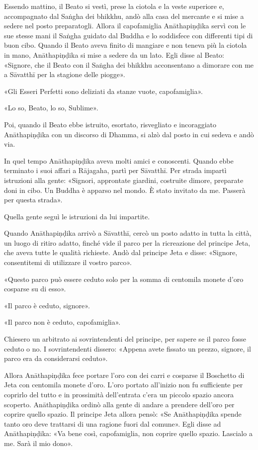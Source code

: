 Essendo mattino, il Beato si vestì, prese la ciotola e la veste superiore e,
accompagnato dal Saṅgha dei bhikkhu, andò alla casa del mercante e si mise a
sedere nel posto preparatogli. Allora il capofamiglia Anāthapiṇḍika servì con le
sue stesse mani il Saṅgha guidato dal Buddha e lo soddisfece con differenti tipi
di buon cibo. Quando il Beato aveva finito di mangiare e non teneva più la
ciotola in mano, Anāthapiṇḍika si mise a sedere da un lato. Egli disse al Beato:
«Signore, che il Beato con il Saṅgha dei bhikkhu acconsentano a dimorare con me
a Sāvatthī per la stagione delle piogge».

«Gli Esseri Perfetti sono deliziati da stanze vuote, capofamiglia».

«Lo so, Beato, lo so, Sublime».

Poi, quando il Beato ebbe istruito, esortato, risvegliato e incoraggiato
Anāthapiṇḍika con un discorso di Dhamma, si alzò dal posto in cui sedeva e andò
via.

In quel tempo Anāthapiṇḍika aveva molti amici e conoscenti. Quando ebbe
terminato i suoi affari a Rājagaha, partì per Sāvatthī. Per strada impartì
istruzioni alla gente: «Signori, approntate giardini, costruite dimore,
preparate doni in cibo. Un Buddha è apparso nel mondo. È stato invitato da me.
Passerà per questa strada».

Quella gente seguì le istruzioni da lui impartite.

Quando Anāthapiṇḍika arrivò a Sāvatthī, cercò un posto adatto in tutta la città,
un luogo di ritiro adatto, finché vide il parco per la ricreazione del principe
Jeta, che aveva tutte le qualità richieste. Andò dal principe Jeta e disse:
«Signore, consentitemi di utilizzare il vostro parco».

«Questo parco può essere ceduto solo per la somma di centomila monete d’oro
cosparse su di esso».

«Il parco è ceduto, signore».

«Il parco non è ceduto, capofamiglia».

Chiesero un arbitrato ai sovrintendenti del principe, per sapere se il parco
fosse ceduto o no. I sovrintendenti dissero: «Appena avete fissato un prezzo,
signore, il parco era da considerarsi ceduto».

Allora Anāthapiṇḍika fece portare l’oro con dei carri e cosparse il Boschetto di
Jeta con centomila monete d’oro. L’oro portato all’inizio non fu sufficiente per
coprirlo del tutto e in prossimità dell’entrata c’era un piccolo spazio ancora
scoperto. Anāthapiṇḍika ordinò alla gente di andare a prendere dell’oro per
coprire quello spazio. Il principe Jeta allora pensò: «Se Anāthapiṇḍika spende
tanto oro deve trattarsi di una ragione fuori dal comune». Egli disse ad
Anāthapiṇḍika: «Va bene così, capofamiglia, non coprire quello spazio. Lascialo
a me. Sarà il mio dono».

